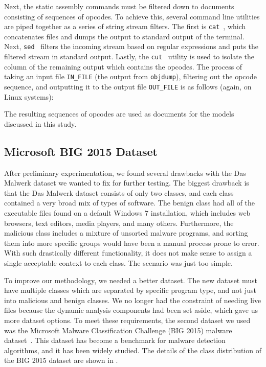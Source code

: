 \documentclass[../stegner_thesis.tex]{subfiles}
\begin{document}


\par Next, the static assembly commands must be filtered down to documents
consisting of sequences of opcodes.
To achieve this, several command line utilities are piped together as a series
of string stream filters.
The first is \texttt{cat}~\cite{CatLinux}, which concatenates files and dumps
the output to standard output of the terminal.
Next, \texttt{sed}~\cite{SedStream} filters the incoming stream based on
regular expressions and puts the filtered stream in standard output.
Lastly, the \texttt{cut}~\cite{CutLinux} utility is used to isolate the column
of the remaining output which contains the opcodes.
The process of taking an input file \texttt{IN\_FILE} (the output from
\texttt{objdump}), filtering out the opcode sequence, and outputting it to the
output file \texttt{OUT\_FILE} is as follows (again, on Linux systems):



\par The resulting sequences of opcodes are used as documents for the models
discussed in this study.

\subsection{Microsoft BIG 2015 Dataset}%
\label{subsec:mthd_msoft_big}

\par After preliminary experimentation, we found several drawbacks with the
Das Malwerk dataset we wanted to fix for further testing.
The biggest drawback is that the Das Malwerk dataset consists of only two
classes, and each class contained a very broad mix of types of software.
The benign class had all of the executable files found on a default Windows 7
installation, which includes web browsers, text editors, media players, and
many others.
Furthermore, the malicious class includes a mixture of unsorted malware
programs, and sorting them into more specific groups would have been a manual
process prone to error.
With such drastically different functionality, it does not make sense to assign
a single acceptable context to each class.
The scenario was just too simple.

\par To improve our methodology, we needed a better dataset.
The new dataset must have multiple classes which are separated by specific
program type, and not just into malicious and benign classes.
We no longer had the constraint of needing live files because the dynamic
analysis components had been set aside, which gave us more dataset options.
To meet these requirements, the second dataset we used was the Microsoft
Malware Classification Challenge (BIG 2015) malware
dataset~\cite{ronenMicrosoftMalware2018}.
This dataset has become a benchmark for malware detection algorithms, and it
has been widely studied.
The details of the class distribution of the BIG 2015 dataset are shown in
.
\end{document}
